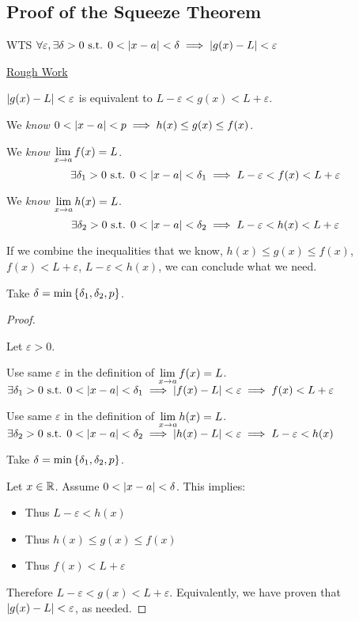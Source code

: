 \subsection{Proof of the Squeeze Theorem}

WTS \(\forall \varepsilon, \exists \delta > 0 \text{ s.t. } 0 < \left|x - a\right| < \delta \implies \left|g(x) - L\right| < \varepsilon\)

\underline{Rough Work}

\(\left|g(x) - L\right| < \varepsilon\) is equivalent to \(L - \varepsilon < g(x) < L + \varepsilon\).

We \emph{know} \(0 < \left|x - a\right| < p \implies h(x) \leq g(x) \leq f(x)\).

We \emph{know} \(\displaystyle \lim_{x \to a} f(x) = L\). \[\exists \delta_{1} > 0 \text{ s.t. } 0 < \left|x - a\right| < \delta_{1} \implies L - \varepsilon < f(x) < L + \varepsilon\]

We \emph{know} \(\displaystyle \lim_{x \to a} h(x) = L\). \[\exists \delta_{2} > 0 \text{ s.t. } 0 < \left|x - a\right| < \delta_{2} \implies L - \varepsilon < h(x) < L + \varepsilon\]

If we combine the inequalities that we know, \(h(x) \leq g(x) \leq f(x)\),  \(f(x) < L + \varepsilon\), \(L - \varepsilon < h(x)\), we can conclude what we need.

Take \(\delta = \min\left\{\delta_{1}, \delta_{2}, p\right\}\).

\begin{proof} \(\)

  Let \(\varepsilon > 0\).

  Use same \(\varepsilon\) in the definition of \(\displaystyle \lim_{x \to a} f(x) = L\). \(\displaystyle \exists \delta_{1} > 0 \text{ s.t. } 0 < \left|x - a\right| < \delta_{1} \implies \left|f(x) - L\right| < \varepsilon \implies f(x) < L + \varepsilon\)

  Use same \(\varepsilon\) in the definition of \(\displaystyle \lim_{x \to a} h(x) = L\). \(\displaystyle \exists \delta_{2} > 0 \text{ s.t. } 0 < \left|x - a\right| < \delta_{2} \implies \left|h(x) - L\right| < \varepsilon \implies L - \varepsilon < h(x)\)

  Take \(\delta = \min\left\{\delta_{1}, \delta_{2}, p\right\}\).

  Let \(x \in \mathbb{R}\). Assume \(0 < \left|x - a\right| < \delta\). This implies:
  \begin{itemize}
    \item {} Thus \(L - \varepsilon < h(x)\)
    \item {} Thus \(h(x) \leq g(x) \leq f(x)\)
    \item {} Thus \(f(x) < L + \varepsilon\)
  \end{itemize}

  Therefore \(L - \varepsilon < g(x) < L + \varepsilon\). Equivalently, we have proven that \(\left|g(x) - L\right| < \varepsilon\), as needed. \qedhere
\end{proof}

